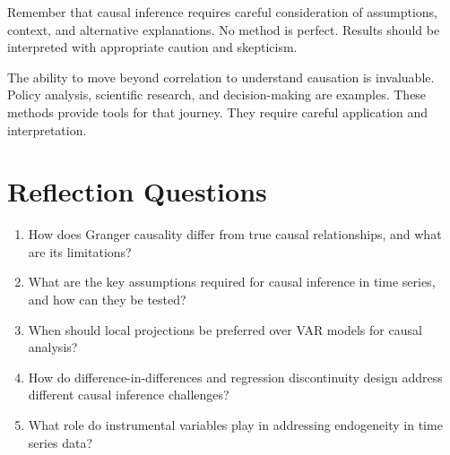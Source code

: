 Remember that causal inference requires careful consideration of assumptions, context, and alternative explanations. No method is perfect. Results should be interpreted with appropriate caution and skepticism.

The ability to move beyond correlation to understand causation is invaluable. Policy analysis, scientific research, and decision-making are examples. These methods provide tools for that journey. They require careful application and interpretation.

\section*{Reflection Questions}

\begin{enumerate}
\item How does Granger causality differ from true causal relationships, and what are its limitations?

\item What are the key assumptions required for causal inference in time series, and how can they be tested?

\item When should local projections be preferred over VAR models for causal analysis?

\item How do difference-in-differences and regression discontinuity design address different causal inference challenges?

\item What role do instrumental variables play in addressing endogeneity in time series data?
\end{enumerate}

